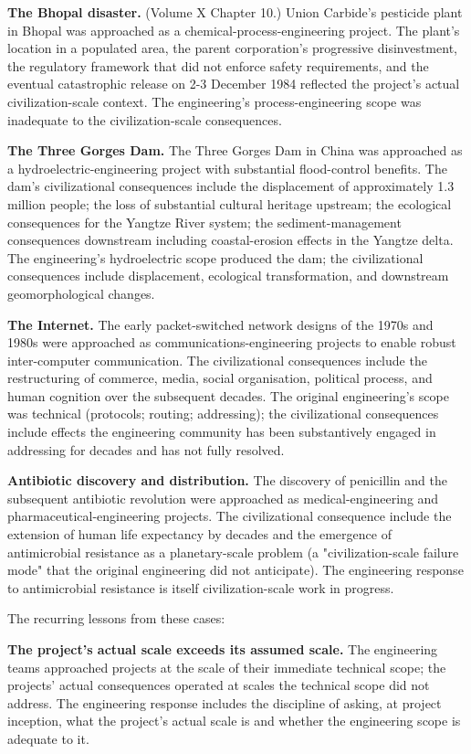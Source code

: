 \textbf{The Bhopal disaster.} (Volume X Chapter 10.) Union Carbide's pesticide plant in Bhopal was approached as a chemical-process-engineering project. The plant's location in a populated area, the parent corporation's progressive disinvestment, the regulatory framework that did not enforce safety requirements, and the eventual catastrophic release on 2-3 December 1984 reflected the project's actual civilization-scale context. The engineering's process-engineering scope was inadequate to the civilization-scale consequences.

\textbf{The Three Gorges Dam.} The Three Gorges Dam in China was approached as a hydroelectric-engineering project with substantial flood-control benefits. The dam's civilizational consequences include the displacement of approximately 1.3 million people; the loss of substantial cultural heritage upstream; the ecological consequences for the Yangtze River system; the sediment-management consequences downstream including coastal-erosion effects in the Yangtze delta. The engineering's hydroelectric scope produced the dam; the civilizational consequences include displacement, ecological transformation, and downstream geomorphological changes.

\textbf{The Internet.} The early packet-switched network designs of the 1970s and 1980s were approached as communications-engineering projects to enable robust inter-computer communication. The civilizational consequences include the restructuring of commerce, media, social organisation, political process, and human cognition over the subsequent decades. The original engineering's scope was technical (protocols; routing; addressing); the civilizational consequences include effects the engineering community has been substantively engaged in addressing for decades and has not fully resolved.

\textbf{Antibiotic discovery and distribution.} The discovery of penicillin and the subsequent antibiotic revolution were approached as medical-engineering and pharmaceutical-engineering projects. The civilizational consequence include the extension of human life expectancy by decades and the emergence of antimicrobial resistance as a planetary-scale problem (a "civilization-scale failure mode" that the original engineering did not anticipate). The engineering response to antimicrobial resistance is itself civilization-scale work in progress.

The recurring lessons from these cases:

\textbf{The project's actual scale exceeds its assumed scale.} The engineering teams approached projects at the scale of their immediate technical scope; the projects' actual consequences operated at scales the technical scope did not address. The engineering response includes the discipline of asking, at project inception, what the project's actual scale is and whether the engineering scope is adequate to it.

